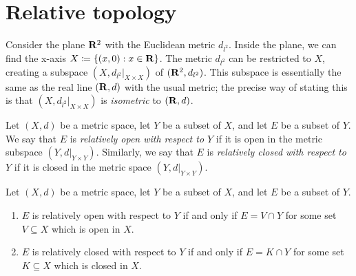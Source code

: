 \section{Relative topology}\label{sec 1.3}

\begin{note}
  Consider the plane \(\mathbf{R}^2\) with the Euclidean metric \(d_{l^2}\).
  Inside the plane, we can find the x-axis \(X \coloneqq \{(x, 0) : x \in \mathbf{R}\}\).
  The metric \(d_{l^2}\) can be restricted to \(X\), creating a subspace \((X, d_{l^2}|_{X \times X})\) of \((\mathbf{R}^2, d_{l^2})\).
  This subspace is essentially the same as the real line \((\mathbf{R}, d)\) with the usual metric;
  the precise way of stating this is that \((X, d_{l^2}|_{X \times X})\) is \emph{isometric} to \((\mathbf{R}, d)\).
\end{note}

\setcounter{theorem}{2}
\begin{definition}\label{1.3.3}
  Let \((X, d)\) be a metric space, let \(Y\) be a subset of \(X\), and let \(E\) be a subset of \(Y\).
  We say that \(E\) is \emph{relatively open with respect to \(Y\)} if it is open in the metric subspace \((Y, d|_{Y \times Y})\).
  Similarly, we say that \(E\) is \emph{relatively closed with respect to \(Y\)} if it is closed in the metric space \((Y, d|_{Y \times Y})\).
\end{definition}

\begin{proposition}\label{1.3.4}
  Let \((X, d)\) be a metric space, let \(Y\) be a subset of \(X\), and let \(E\) be a subset of \(Y\).
  \begin{enumerate}
    \item \(E\) is relatively open with respect to \(Y\) if and only if \(E = V \cap Y\) for some set \(V \subseteq X\) which is open in \(X\).
    \item \(E\) is relatively closed with respect to \(Y\) if and only if \(E = K \cap Y\) for some set \(K \subseteq X\) which is closed in \(X\).
  \end{enumerate}
\end{proposition}

